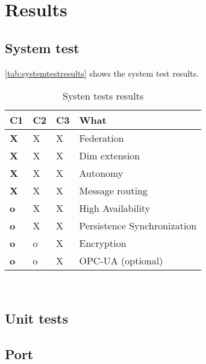 \chapter{Results}\label{ch:res}

\section{System test}
\autoref{tab:systemtestresults} shows the system test results.
\begin{table}[H]
  \centering
  \scriptsize
  \begin{tabular}{|p{5mm}|p{5mm}|p{5mm}|p{20mm}|}
    \hline 	\bf C1 & C2 & C3 & What \\ \hline
	\bf \color{green!50}X & \color{green!50}X & \color{green!50}X & Federation \\ \hline
	\bf \color{green!50}X & \color{green!50}X & \color{green!50}X & Dim extension \\ \hline
	\bf \color{green!50}X & \color{green!50}X & \color{green!50}X & Autonomy \\ \hline
	\bf \color{green!50}X & \color{green!50}X & \color{green!50}X & Message routing \\ \hline
	\bf \color{red!50}o & \color{green!50}X & \color{green!50}X & High Availability \\ \hline
	\bf \color{red!50}o & \color{green!50}X & \color{green!50}X & Persistence Synchronization \\ \hline
	\bf \color{red!50}o & \color{red!50}o & \color{green!50}X & Encryption \\ \hline
	\bf \color{red!50}o & \color{red!50}o & \color{green!50}X & OPC-UA (optional) \\ \hline
  \end{tabular} \\
  \caption{Systen tests results}
  \label{tab:systemtestresults}
\end{table}

\section{Unit tests}


\section{Port}\label{sec:res:port}


